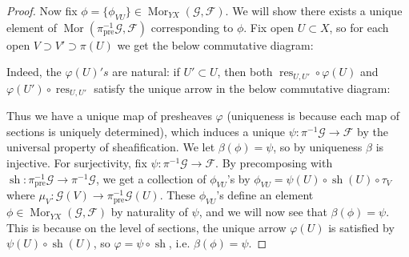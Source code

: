 \documentclass{article}
\newcommand{\fF}{\mathscr{F}}
\newcommand{\fG}{\mathscr{G}}
\DeclareMathOperator{\res}{\mathrm{res}}
\DeclareMathOperator{\pre}{\mathrm{pre}}
\DeclareMathOperator{\Mor}{\mathrm{Mor}}
\DeclareMathOperator{\sh}{sh}
\begin{document}
\begin{proof}
    Now fix $\phi =\{\phi_{VU}\} \in \Mor_{YX}(\fG,\fF)$. We will show there exists a unique element of $\Mor(\pi^{-1}_{\pre} \fG,\fF)$ corresponding to $\phi$. Fix open $U\subset X$, so for each open $V\supset V'\supset \pi(U)$ we get the below commutative diagram:
    \begin{center}
    \end{center}
    Indeed, the $\varphi(U)'s$ are natural: if $U'\subset U$, then both $\res_{U,U'}\circ \varphi(U)$ and $\varphi(U')\circ \res_{U,U'}$ satisfy the unique arrow in the below commutative diagram:
    \begin{center}
    \end{center}
    Thus we have a unique map of presheaves $\varphi$ (uniqueness is because each map of sections is uniquely determined), which induces a unique $\psi:\pi^{-1}\fG \to \fF$ by the universal property of sheafification. We let $\beta(\phi) = \psi$, so by uniqueness $\beta$ is injective. For surjectivity, fix $\psi:\pi^{-1} \fG\to \fF$. By precomposing with $\sh:\pi^{-1}_{\pre}\fG \to \pi^{-1} \fG$, we get a collection of $\phi_{VU}$'s by $\phi_{VU}=\psi(U)\circ \sh(U) \circ \tau_V$ where $\mu_V:\fG(V)\to \pi^{-1}_{\pre} \fG(U)$. These $\phi_{VU}$'s define an element $\phi \in \Mor_{YX}(\fG,\fF)$ by naturality of $\psi$, and we will now see that $\beta(\phi)=\psi$. This is because on the level of sections, the unique arrow $\varphi(U)$ is satisfied by $\psi(U)\circ \sh(U)$, so $\varphi = \psi \circ \sh$, i.e. $\beta(\phi)=\psi$.


\end{proof}
\end{document}
